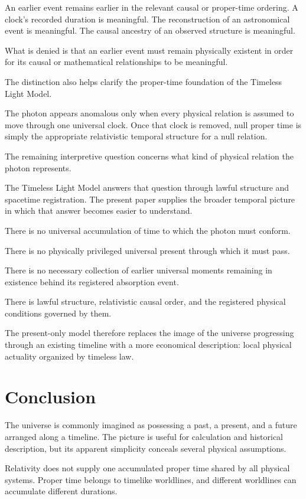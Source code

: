 \documentclass[12pt,onecolumn]{article}
\begin{document}
An earlier event remains earlier in the relevant causal or proper-time ordering. A clock's recorded duration is meaningful. The reconstruction of an astronomical event is meaningful. The causal ancestry of an observed structure is meaningful.

What is denied is that an earlier event must remain physically existent in order for its causal or mathematical relationships to be meaningful.

The distinction also helps clarify the proper-time foundation of the Timeless Light Model.

The photon appears anomalous only when every physical relation is assumed to move through one universal clock. Once that clock is removed, null proper time is simply the appropriate relativistic temporal structure for a null relation.

The remaining interpretive question concerns what kind of physical relation the photon represents.

The Timeless Light Model answers that question through lawful structure and spacetime registration. The present paper supplies the broader temporal picture in which that answer becomes easier to understand.

There is no universal accumulation of time to which the photon must conform.

There is no physically privileged universal present through which it must pass.

There is no necessary collection of earlier universal moments remaining in existence behind its registered absorption event.

There is lawful structure, relativistic causal order, and the registered physical conditions governed by them.

The present-only model therefore replaces the image of the universe progressing through an existing timeline with a more economical description: local physical actuality organized by timeless law.

\section{Conclusion}

The universe is commonly imagined as possessing a past, a present, and a future arranged along a timeline. The picture is useful for calculation and historical description, but its apparent simplicity conceals several physical assumptions.

Relativity does not supply one accumulated proper time shared by all physical systems. Proper time belongs to timelike worldlines, and different worldlines can accumulate different durations.
\end{document}
